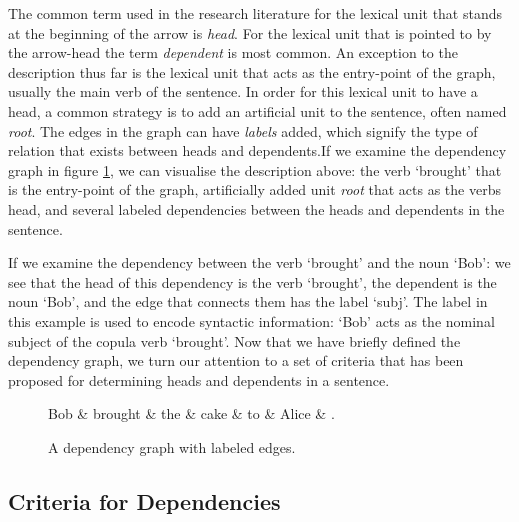 The common term used in the research literature for the lexical unit that stands at the beginning of the arrow is \textit{head}. For the lexical unit that is pointed to by the arrow-head the term \textit{dependent} is most common. An exception to the description thus far is the lexical unit that acts as the entry-point of the graph, usually the main verb of the sentence. In order for this lexical unit to have a head, a common strategy is to add an artificial unit to the sentence, often named \textit{root}. The edges in the graph can have \textit{labels} added, which signify the type of relation that exists between heads and dependents.If we examine the dependency graph in figure \ref{dep1}, we can visualise the description above: the verb `brought' that is the entry-point of the graph, artificially added unit \textit{root} that acts as the verbs head, and several labeled dependencies between the heads and dependents in the sentence. 

If we examine the dependency between the verb `brought' and the noun `Bob': we see that the head of this dependency is the verb `brought', the dependent is the noun `Bob', and the edge that connects them has the label `subj'. The label in this example is used to encode syntactic information: `Bob' acts as the nominal subject of the copula verb `brought'. Now that we have briefly defined the dependency graph, we turn our attention to a set of criteria that has been proposed for determining heads and dependents in a sentence.

\begin{figure}
    \begin{dependency}[]
        \begin{deptext}[column sep=1em, row sep=.1ex]
            Bob \& brought \& the \& cake \& to \& Alice \& . \\
        \end{deptext}
    \end{dependency}
    \caption{A dependency graph with labeled edges.}
    \label{dep1}
\end{figure}

\subsection{Criteria for Dependencies}
\label{criteria}

